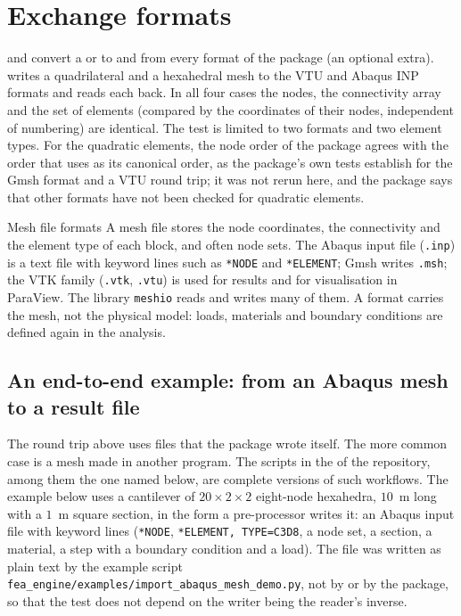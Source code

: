 \section{Exchange formats}\label{sec:me-io}

 and  convert a  or  to and from every format of the  package (an optional extra).  writes a quadrilateral and a hexahedral mesh to the VTU and Abaqus INP formats and reads each back. In all four cases the nodes, the connectivity array and the set of elements (compared by the coordinates of their nodes, independent of numbering) are identical. The test is limited to two formats and two element types. For the quadratic elements, the node order of the package agrees with the order that  uses as its canonical order, as the package's own tests establish for the Gmsh format and a VTU round trip; it was not rerun here, and the package says that other formats have not been checked for quadratic elements.

\begin{sidenote}{Mesh file formats}
A mesh file stores the node coordinates, the connectivity and the element type of each block, and often node sets. The Abaqus input file (\texttt{.inp}) is a text file with keyword lines such as \texttt{*NODE} and \texttt{*ELEMENT}; Gmsh writes \texttt{.msh}; the VTK family (\texttt{.vtk}, \texttt{.vtu}) is used for results and for visualisation in ParaView. The library \texttt{meshio} reads and writes many of them. A format carries the mesh, not the physical model: loads, materials and boundary conditions are defined again in the analysis.
\end{sidenote}

\begin{table}[ht]
\centering\small

\caption{Round trip of a mesh through  and .}\label{tab:me-meshio}
\end{table}

\subsection{An end-to-end example: from an Abaqus mesh to a result file}\label{sec:me-example}

The round trip above uses files that the package wrote itself. The more common case is a mesh made in another program. The scripts in the  of the repository, among them the one named below, are complete versions of such workflows. The example below uses a cantilever of $20\times2\times2$ eight-node hexahedra, $10$~m long with a $1$~m square section, in the form a pre-processor writes it: an Abaqus input file with \cmiNsetLines{} keyword lines (\texttt{*NODE}, \texttt{*ELEMENT, TYPE=C3D8}, a node set, a section, a material, a step with a boundary condition and a load). The file was written as plain text by the example script \texttt{fea\_engine/examples/import\_abaqus\_mesh\_demo.py}, not by  or by the package, so that the test does not depend on the writer being the reader's inverse.

